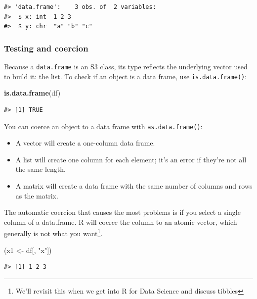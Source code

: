 \documentclass[]{book}
\newenvironment{Shaded}{\begin{snugshade}}{\end{snugshade}}
\newcommand{\KeywordTok}[1]{\textcolor[rgb]{0.13,0.29,0.53}{\textbf{#1}}}
\newcommand{\StringTok}[1]{\textcolor[rgb]{0.31,0.60,0.02}{#1}}
\newcommand{\NormalTok}[1]{#1}
\let\rmarkdownfootnote\footnote%
\def\footnote{\protect\rmarkdownfootnote}
\theoremstyle{definition}
\theoremstyle{definition}
\theoremstyle{definition}
\theoremstyle{remark}
\begin{document}
\begin{verbatim}
#> 'data.frame':    3 obs. of  2 variables:
#>  $ x: int  1 2 3
#>  $ y: chr  "a" "b" "c"
\end{verbatim}

\subsubsection{Testing and coercion}\label{testing-and-coercion}

Because a \texttt{data.frame} is an S3 class, its type reflects the
underlying vector used to build it: the list. To check if an object is a
data frame, use \texttt{is.data.frame()}:

\begin{Shaded}
\begin{Highlighting}[]
\KeywordTok{is.data.frame}\NormalTok{(df)}
\end{Highlighting}
\end{Shaded}

\begin{verbatim}
#> [1] TRUE
\end{verbatim}

You can coerce an object to a data frame with \texttt{as.data.frame()}:

\begin{itemize}
\item
  A vector will create a one-column data frame.
\item
  A list will create one column for each element; it's an error if
  they're not all the same length.
\item
  A matrix will create a data frame with the same number of columns and
  rows as the matrix.
\end{itemize}

The automatic coercion that causes the most problems is if you select a
single column of a data.frame. R will coerce the column to an atomic
vector, which generally is not what you want\footnote{We'll revisit this
  when we get into R for Data Science and discuss tibbles}.

\begin{Shaded}
\begin{Highlighting}[]
\NormalTok{(x1 <-}\StringTok{ }\NormalTok{df[, }\StringTok{"x"}\NormalTok{])}
\end{Highlighting}
\end{Shaded}

\begin{verbatim}
#> [1] 1 2 3
\end{verbatim}
\end{document}
